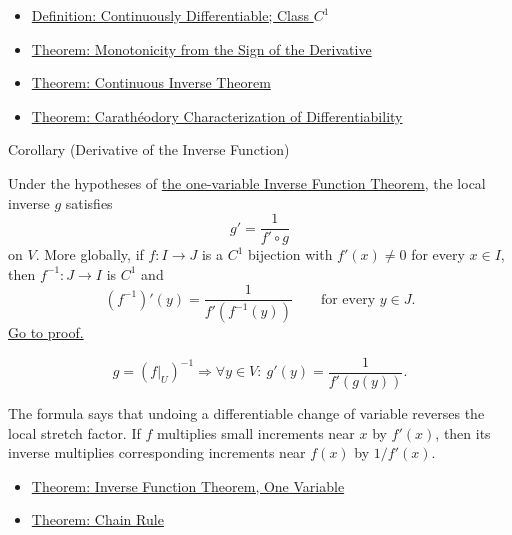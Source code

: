 \begin{dependencies}
\begin{itemize}
  \item \hyperref[def:class-c1]{Definition: Continuously Differentiable; Class \(C^1\)}
  \item \hyperref[thm:nondecreasing-iff-nonneg-derivative]{Theorem: Monotonicity from the Sign of the Derivative}
  \item \hyperref[thm:continuous-inverse-theorem]{Theorem: Continuous Inverse Theorem}
  \item \hyperref[thm:caratheodory-characterization-of-differentiability]{Theorem: Carath\'{e}odory Characterization of Differentiability}
\end{itemize}
\end{dependencies}

\begin{corollarybox}{Corollary (Derivative of the Inverse Function)}
\begin{corollary}
\label{cor:inverse-function-derivative}
Under the hypotheses of \hyperref[thm:inverse-function-theorem-one-variable]{the one-variable Inverse Function Theorem}, the local inverse \(g\) satisfies
\[
  g'=\frac{1}{f'\circ g}
\]
on \(V\). More globally, if \(f:I\to J\) is a \(C^1\) bijection with \(f'(x)\neq 0\) for every \(x\in I\), then \(f^{-1}:J\to I\) is \(C^1\) and
\[
  (f^{-1})'(y)=\frac{1}{f'(f^{-1}(y))}
  \qquad\text{for every }y\in J.
\]
\hyperref[prf:inverse-function-derivative]{Go to proof.}
\end{corollary}
\end{corollarybox}

\begin{remark*}
\[
  g=(f|_U)^{-1}
  \Longrightarrow
  \forall y\in V:\ g'(y)=\frac{1}{f'(g(y))}.
\]
\end{remark*}

\begin{remark*}[Interpretation]
The formula says that undoing a differentiable change of variable reverses the local stretch factor. If \(f\) multiplies small increments near \(x\) by \(f'(x)\), then its inverse multiplies corresponding increments near \(f(x)\) by \(1/f'(x)\).
\end{remark*}

\begin{dependencies}
\begin{itemize}
  \item \hyperref[thm:inverse-function-theorem-one-variable]{Theorem: Inverse Function Theorem, One Variable}
  \item \hyperref[thm:chain-rule]{Theorem: Chain Rule}
\end{itemize}
\end{dependencies}
